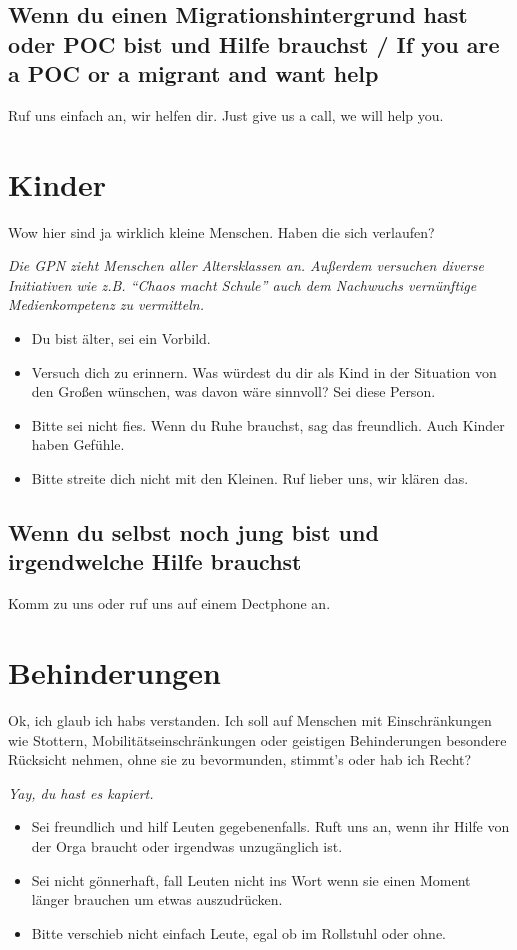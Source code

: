 \documentclass[10pt,notumble]{leaflet}
\newcommand\dos{\item[$+$]}
\newcommand\donts{\item[$-$]}
\begin{document}
\subsection{Wenn du einen Migrationshintergrund hast oder POC bist und Hilfe brauchst / If you are a POC or a migrant and want help}
Ruf uns einfach an, wir helfen dir. Just give us a call, we will help
you.


\section{Kinder}
\label{sec-6}
 Wow hier sind ja wirklich kleine Menschen. Haben die sich verlaufen?

 \emph{Die GPN zieht Menschen aller Altersklassen an. Außerdem
  versuchen diverse Initiativen wie z.B. ``Chaos macht Schule'' auch
  dem Nachwuchs vernünftige Medienkompetenz zu vermitteln.}


\label{sec-6-1}
\begin{itemize}
\dos Du bist älter, sei ein Vorbild.
\dos Versuch dich zu erinnern. Was würdest du dir als Kind in der
  Situation von den Großen wünschen, was davon wäre sinnvoll? Sei
  diese Person.
\donts Bitte sei nicht fies. Wenn du Ruhe brauchst, sag das
  freundlich. Auch Kinder haben Gefühle.
\donts Bitte streite dich nicht mit den Kleinen. Ruf lieber uns, wir klären
das.
\end{itemize}
\subsection{Wenn du selbst noch jung bist und irgendwelche Hilfe brauchst}
Komm zu uns oder ruf uns auf einem Dectphone an. 


\section{Behinderungen}
Ok, ich glaub ich habs verstanden. Ich soll auf Menschen mit
Einschränkungen wie Stottern, Mobilitätseinschränkungen oder geistigen
Behinderungen besondere Rücksicht nehmen, ohne sie zu bevormunden,
stimmt's oder hab ich Recht?

\emph{Yay, du hast es kapiert.}


\label{sec-7-1}
\begin{itemize}
\dos Sei freundlich und hilf Leuten gegebenenfalls. Ruft uns an, wenn
  ihr Hilfe von der Orga braucht oder irgendwas unzugänglich ist.
\donts Sei nicht gönnerhaft, fall Leuten nicht ins Wort
  wenn sie einen Moment länger brauchen um etwas auszudrücken.
\donts Bitte verschieb nicht einfach Leute, egal ob im Rollstuhl oder
  ohne.
\end{itemize}
\end{document}

